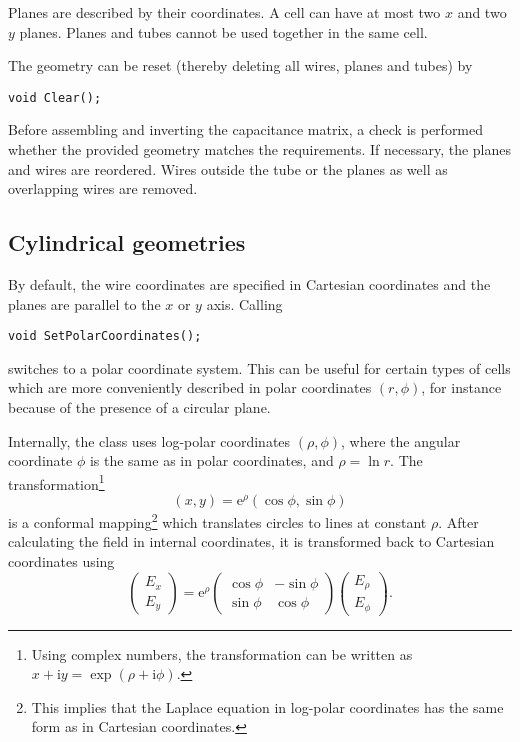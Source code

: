 Planes are described by their coordinates. 
A cell can have at most two \(x\) and two \(y\) planes. 
Planes and tubes cannot be used together in the same cell.

The geometry can be reset (thereby deleting all wires, planes and tubes) by
\begin{lstlisting}
void Clear();
\end{lstlisting}

Before assembling and inverting the capacitance matrix, 
a check is performed whether the provided geometry matches the requirements.
If necessary, the planes and wires are reordered. 
Wires outside the tube or the planes as well as overlapping wires are removed.

\subsection{Cylindrical geometries}

By default, the wire coordinates are specified in Cartesian coordinates and 
the planes are parallel to the $x$ or $y$ axis.
Calling 
\begin{lstlisting}
void SetPolarCoordinates();
\end{lstlisting} 
switches to a polar coordinate system. This can be useful for 
certain types of cells which are more conveniently described in polar coordinates
$\left(r, \phi\right)$, for instance because of the presence of a circular plane. 

Internally, the class uses log-polar coordinates $\left(\rho, \phi\right)$, 
where the angular coordinate $\phi$ is the same as in polar coordinates, 
and $\rho = \ln r$. The transformation\footnote{
Using complex numbers, the transformation can be written as 
$x + \text{i}y = \exp\left(\rho + \text{i}\phi\right)$.}
\begin{equation*}
\left(x, y\right) = \text{e}^{\rho}\left(\cos\phi, \sin\phi\right)
\end{equation*}
is a conformal mapping\footnote{This implies that the Laplace equation in log-polar coordinates has the same form as in Cartesian coordinates.} 
which translates circles to lines at constant $\rho$. 
After calculating the field in internal coordinates, it is transformed back to 
Cartesian coordinates using
\begin{equation*}
\begin{pmatrix}E_{x}\\E_{y}\end{pmatrix} = \text{e}^{\rho}
\begin{pmatrix}\cos\phi & -\sin\phi \\ \sin\phi & \cos\phi\end{pmatrix}
\begin{pmatrix}E_{\rho}\\E_{\phi}\end{pmatrix}. 
\end{equation*}

